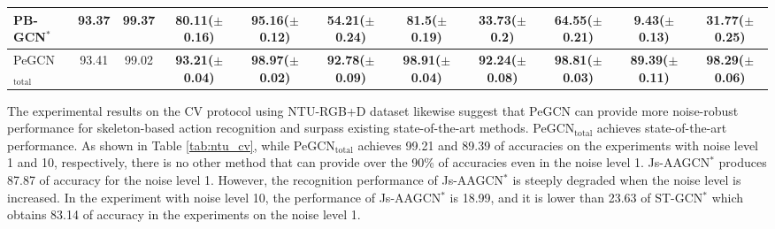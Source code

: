\documentclass[runningheads]{llncs}
\begin{document}
\begin{table*}[t]
{\begin{tabular}{l c c c c c c c c c c}
		

        \multicolumn{1}{l}{PB-GCN$^{*}$ \cite{thakkar2018part}} & 93.37 &	\textbf{99.37} & 80.11($\pm$0.16)&	95.16($\pm$0.12)&	54.21($\pm$0.24)&	81.5($\pm$0.19)&33.73($\pm$0.2)&	64.55($\pm$0.21)&	9.43($\pm$0.13)&	31.77($\pm$0.25) \\


	    \hline
		\multicolumn{1}{l}{PeGCN$_{\text{total}}$} &
		93.41 &	99.02 & \textbf{93.21($\pm$0.04)}&	\textbf{98.97($\pm$0.02)}&	\textbf{92.78($\pm$0.09)}&	\textbf{98.91($\pm$0.04)}&	\textbf{92.24($\pm$0.08)}&	\textbf{98.81($\pm$0.03)}&	\textbf{89.39($\pm$0.11)}&	\textbf{98.29($\pm$0.06) }\\
		\midrule
		\bottomrule
	\end{tabular}
}
	\caption{Recognition accuracies depending on the noise level using the CV protocol of NTU-RGB+D dataset. $^{*}$ indicates that the method were trained and tested by ourselves. The boldface figures denote the highest performance for each experiment.}
	\label{tab:ntu_cv}
	\vspace{-6ex}
\end{table*}

The experimental results on the CV protocol using NTU-RGB+D dataset likewise suggest that PeGCN can provide more noise-robust performance for skeleton-based action recognition and surpass existing state-of-the-art methods. PeGCN$_{\text{total}}$ achieves state-of-the-art performance. As shown in Table \ref{tab:ntu_cv}, while PeGCN$_{\text{total}}$ achieves 99.21 and 89.39 of accuracies on the experiments with noise level 1 and 10, respectively, there is no other method that can provide over the 90\% of accuracies even in the noise level 1. Js-AAGCN$^{*}$ \cite{shi2019multi} produces 87.87 of accuracy for the noise level 1. However, the recognition performance of Js-AAGCN$^{*}$ is steeply degraded when the noise level is increased. In the experiment with noise level 10, the performance of Js-AAGCN$^{*}$ is 18.99, and it is lower than 23.63 of ST-GCN$^{*}$ \cite{yan2018spatial} which obtains 83.14 of accuracy in the experiments on the noise level 1. 
\end{document}
